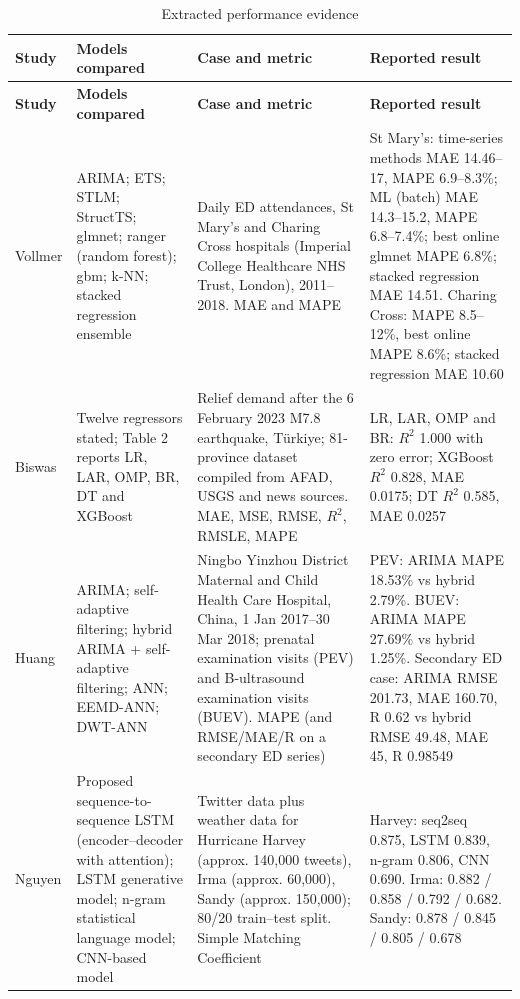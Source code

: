 \begingroup\scriptsize
\begin{longtable}{@{}L{2.0cm}L{3.6cm}L{3.6cm}L{5.4cm}@{}}
\caption{Extracted performance evidence}\label{tab:efficacy} \\
\toprule
\textbf{Study} & \textbf{Models compared} & \textbf{Case and metric} & \textbf{Reported result} \\
\midrule
\endfirsthead
\toprule
\textbf{Study} & \textbf{Models compared} & \textbf{Case and metric} & \textbf{Reported result} \\
\midrule
\endhead
\bottomrule
\endlastfoot
Vollmer \cite{Vollmer2021ADepartments} & ARIMA; ETS; STLM; StructTS; glmnet; ranger (random forest); gbm; k-NN; stacked regression ensemble & Daily ED attendances, St Mary's and Charing Cross hospitals (Imperial College Healthcare NHS Trust, London), 2011--2018. MAE and MAPE & St Mary's: time-series methods MAE 14.46--17, MAPE 6.9--8.3\%; ML (batch) MAE 14.3--15.2, MAPE 6.8--7.4\%; best online glmnet MAPE 6.8\%; stacked regression MAE 14.51. Charing Cross: MAPE 8.5--12\%, best online MAPE 8.6\%; stacked regression MAE 10.60 \\[2pt]
Biswas \cite{Biswas2024AnTurkiye} & Twelve regressors stated; Table 2 reports LR, LAR, OMP, BR, DT and XGBoost & Relief demand after the 6 February 2023 M7.8 earthquake, T\"{u}rkiye; 81-province dataset compiled from AFAD, USGS and news sources. MAE, MSE, RMSE, $R^2$, RMSLE, MAPE & LR, LAR, OMP and BR: $R^2$ 1.000 with zero error; XGBoost $R^2$ 0.828, MAE 0.0175; DT $R^2$ 0.585, MAE 0.0257 \\[2pt]
Huang \cite{Huang2020MedicalMethod} & ARIMA; self-adaptive filtering; hybrid ARIMA + self-adaptive filtering; ANN; EEMD-ANN; DWT-ANN & Ningbo Yinzhou District Maternal and Child Health Care Hospital, China, 1 Jan 2017--30 Mar 2018; prenatal examination visits (PEV) and B-ultrasound examination visits (BUEV). MAPE (and RMSE/MAE/R on a secondary ED series) & PEV: ARIMA MAPE 18.53\% vs hybrid 2.79\%. BUEV: ARIMA MAPE 27.69\% vs hybrid 1.25\%. Secondary ED case: ARIMA RMSE 201.73, MAE 160.70, R 0.62 vs hybrid RMSE 49.48, MAE 45, R 0.98549 \\[2pt]
Nguyen \cite{Nguyen2022ForecastingNetwork} & Proposed sequence-to-sequence LSTM (encoder--decoder with attention); LSTM generative model; n-gram statistical language model; CNN-based model & Twitter data plus weather data for Hurricane Harvey (approx. 140,000 tweets), Irma (approx. 60,000), Sandy (approx. 150,000); 80/20 train--test split. Simple Matching Coefficient & Harvey: seq2seq 0.875, LSTM 0.839, n-gram 0.806, CNN 0.690. Irma: 0.882 / 0.858 / 0.792 / 0.682. Sandy: 0.878 / 0.845 / 0.805 / 0.678 \\[2pt]

\end{longtable}
